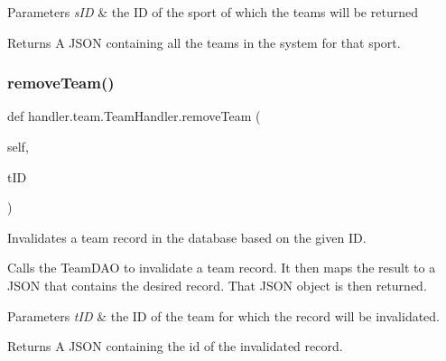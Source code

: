 \begin{DoxyParams}{Parameters}
{\em s\+ID} & the ID of the sport of which the teams will be returned\\
\hline
\end{DoxyParams}
\begin{DoxyReturn}{Returns}
A J\+S\+ON containing all the teams in the system for that sport. 
\end{DoxyReturn}
\mbox{\label{classhandler_1_1team_1_1_team_handler_abc55ff5f4532a8486f8c941876dc84ce}} 
\subsubsection{\texorpdfstring{remove\+Team()}{removeTeam()}}
{\footnotesize\ttfamily def handler.\+team.\+Team\+Handler.\+remove\+Team (\begin{DoxyParamCaption}\item[{}]{self,  }\item[{}]{t\+ID }\end{DoxyParamCaption})}



Invalidates a team record in the database based on the given ID. 

Calls the Team\+D\+AO to invalidate a team record. It then maps the result to a J\+S\+ON that contains the desired record. That J\+S\+ON object is then returned.


\begin{DoxyParams}{Parameters}
{\em t\+ID} & the ID of the team for which the record will be invalidated.\\
\hline
\end{DoxyParams}
\begin{DoxyReturn}{Returns}
A J\+S\+ON containing the id of the invalidated record. 
\end{DoxyReturn}
\mbox{\label{classhandler_1_1team_1_1_team_handler_a9edec7a490cd154b7d4033badb1fdacf}} 
